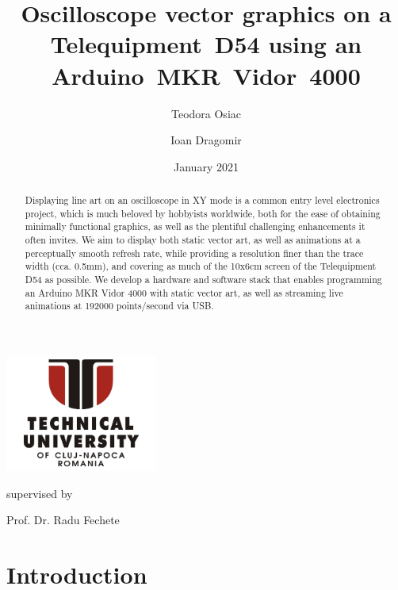 \documentclass[12pt]{article}
\title{Oscilloscope vector graphics on a \mbox{Telequipment D54} using an \mbox{Arduino MKR Vidor 4000}}
\author{Teodora Osiac \and Ioan Dragomir}
\date{January 2021}
\begin{document}
\makeatletter
\renewcommand{\and}{\quad}
\begin{titlepage}
	\vspace*{\fill}
	\centering

	\makeatletter
	\centering{\LARGE\bfseries \@title \par} \vspace{1.5cm}

	\includegraphics[height=1.5in]{images/tucn-logo.jpg}\par

	\vspace{1.5cm}
	{\Large\@author \par}\vspace{0.45cm}

	{\large supervised by\par
	Prof. Dr. Radu Fechete}

	\vspace*{\fill}
	{\large \@date\par}
\end{titlepage}
\makeatother

\begin{abstract}
\noindent Displaying line art on an oscilloscope in XY mode is a common entry level electronics project, which is much beloved by hobbyists worldwide, both for the ease of obtaining minimally functional graphics, as well as the plentiful challenging enhancements it often invites. We aim to display both static vector art, as well as animations at a perceptually smooth refresh rate, while providing a resolution finer than the trace width (cca. 0.5mm), and covering as much of the 10x6cm screen of the Telequipment D54 as possible. We develop a hardware and software stack that enables programming an Arduino MKR Vidor 4000 with static vector art, as well as streaming live animations at 192000 points/second via USB.

\end{abstract}

\tableofcontents

\newpage

\section{Introduction}
\end{document}
